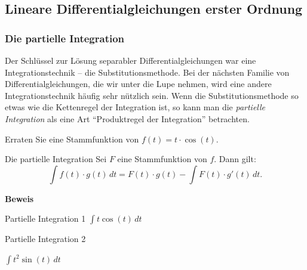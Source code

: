 
























\clearpage

\subsection{Lineare Differentialgleichungen erster Ordnung}

\subsubsection{Die partielle Integration}

Der Schlüssel zur Lösung separabler Differentialgleichungen war
eine Integrationstechnik -- die Substitutionsmethode.
Bei der nächsten Familie von Differentialgleichungen, die wir
unter die Lupe nehmen, wird eine andere Integrationstechnik
häufig sehr nützlich sein. Wenn die Substitutionsmethode so
etwas wie die Kettenregel der Integration ist, so kann man die
\emph{partielle Integration} als eine Art
\enquote{Produktregel der Integration} betrachten.

\begin{LA}{}{}
    Erraten Sie eine Stammfunktion von
    \(f(t)=t\cdot\cos(t)\).
\end{LA}

\begin{satz}{Die partielle Integration}{}
    Sei \(F\) eine Stammfunktion von \(f\). Dann gilt:
    \[
        \int f(t)\cdot g(t)\,dt
        =F(t)\cdot g(t)
        -\int F(t)\cdot g'(t)\,dt.
    \]
\end{satz}

\textbf{Beweis}

\vspace{3cm}

\begin{bsp}{Partielle Integration 1}{}
    \(
    \int t\cos(t)\,dt
    \)

    \vspace{2cm}
\end{bsp}

\begin{bsp}{Partielle Integration 2}{}

    \(        \int t^2\sin(t)\,dt\)

    \vspace{3cm}
\end{bsp}

